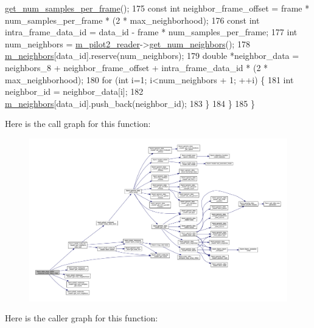 \begin{DoxyCode}
      \hyperlink{classlbann_1_1pilot2__molecular__reader_a91e233f9878e93e31de2085cbcad1f10}{get\_num\_samples\_per\_frame}();
175     \textcolor{keyword}{const} \textcolor{keywordtype}{int} neighbor\_frame\_offset = frame * num\_samples\_per\_frame * (2 * max\_neighborhood);
176     \textcolor{keyword}{const} \textcolor{keywordtype}{int} intra\_frame\_data\_id = data\_id - frame * num\_samples\_per\_frame;
177     \textcolor{keywordtype}{int} num\_neighbors = \hyperlink{classlbann_1_1data__store__pilot2__molecular_a1875ae12fe7c2b11818ddb3fecff9f72}{m\_pilot2\_reader}->\hyperlink{classlbann_1_1pilot2__molecular__reader_a7c379056841cda42247ff518270bcfdf}{get\_num\_neighbors}();
178     \hyperlink{classlbann_1_1data__store__pilot2__molecular_a567c6bcdfab6f9248f3c320d505861bc}{m\_neighbors}[data\_id].reserve(num\_neighbors);
179     \textcolor{keywordtype}{double} *neighbor\_data = neighbors\_8 + neighbor\_frame\_offset + intra\_frame\_data\_id * (2 * 
      max\_neighborhood);
180     \textcolor{keywordflow}{for} (\textcolor{keywordtype}{int} i=1; i<num\_neighbors + 1; ++i) \{
181       \textcolor{keywordtype}{int} neighbor\_id = neighbor\_data[i];
182       \hyperlink{classlbann_1_1data__store__pilot2__molecular_a567c6bcdfab6f9248f3c320d505861bc}{m\_neighbors}[data\_id].push\_back(neighbor\_id);
183     \}
184   \}
185 \}
\end{DoxyCode}
Here is the call graph for this function\+:\nopagebreak
\begin{figure}[H]
\begin{center}
\leavevmode
\includegraphics[width=350pt]{classlbann_1_1data__store__pilot2__molecular_af70726cfb8377832ce457d9b874bf34e_cgraph}
\end{center}
\end{figure}
Here is the caller graph for this function\+:\nopagebreak
